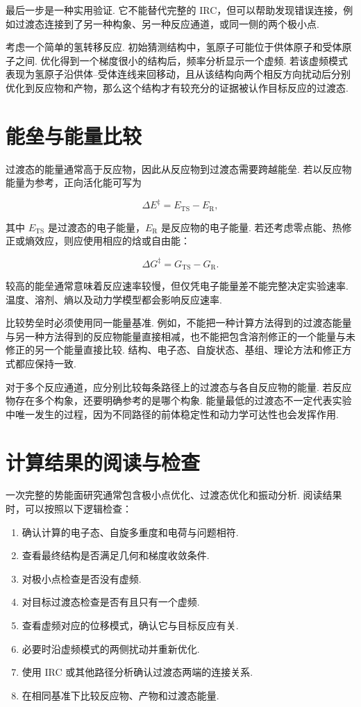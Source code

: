 \documentclass[UTF8,11pt,a4paper,openany]{ctexbook}
\begin{document}
最后一步是一种实用验证. 它不能替代完整的 IRC，但可以帮助发现错误连接，例如过渡态连接到了另一种构象、另一种反应通道，或同一侧的两个极小点. 

\begin{examplebox}
考虑一个简单的氢转移反应. 初始猜测结构中，氢原子可能位于供体原子和受体原子之间. 优化得到一个梯度很小的结构后，频率分析显示一个虚频. 若该虚频模式表现为氢原子沿供体--受体连线来回移动，且从该结构向两个相反方向扰动后分别优化到反应物和产物，那么这个结构才有较充分的证据被认作目标反应的过渡态. 
\end{examplebox}

\section{能垒与能量比较}

过渡态的能量通常高于反应物，因此从反应物到过渡态需要跨越能垒. 若以反应物能量为参考，正向活化能可写为

\[
\Delta E^\ddagger
=
E_{\mathrm{TS}}-E_{\mathrm{R}},
\]

其中 $E_{\mathrm{TS}}$ 是过渡态的电子能量，$E_{\mathrm{R}}$ 是反应物的电子能量. 若还考虑零点能、热修正或熵效应，则应使用相应的焓或自由能：

\[
\Delta G^\ddagger
=
G_{\mathrm{TS}}-G_{\mathrm{R}}.
\]

较高的能垒通常意味着反应速率较慢，但仅凭电子能量差不能完整决定实验速率. 温度、溶剂、熵以及动力学模型都会影响反应速率. 

\begin{limitbox}
比较势垒时必须使用同一能量基准. 例如，不能把一种计算方法得到的过渡态能量与另一种方法得到的反应物能量直接相减，也不能把包含溶剂修正的一个能量与未修正的另一个能量直接比较. 结构、电子态、自旋状态、基组、理论方法和修正方式都应保持一致. 
\end{limitbox}

对于多个反应通道，应分别比较每条路径上的过渡态与各自反应物的能量. 若反应物存在多个构象，还要明确参考的是哪个构象. 能量最低的过渡态不一定代表实验中唯一发生的过程，因为不同路径的前体稳定性和动力学可达性也会发挥作用. 

\section{计算结果的阅读与检查}

一次完整的势能面研究通常包含极小点优化、过渡态优化和振动分析. 阅读结果时，可以按照以下逻辑检查：

\begin{enumerate}
\item 确认计算的电子态、自旋多重度和电荷与问题相符. 
\item 查看最终结构是否满足几何和梯度收敛条件. 
\item 对极小点检查是否没有虚频. 
\item 对目标过渡态检查是否有且只有一个虚频. 
\item 查看虚频对应的位移模式，确认它与目标反应有关. 
\item 必要时沿虚频模式的两侧扰动并重新优化. 
\item 使用 IRC 或其他路径分析确认过渡态两端的连接关系. 
\item 在相同基准下比较反应物、产物和过渡态能量. 
\end{enumerate}
\end{document}
